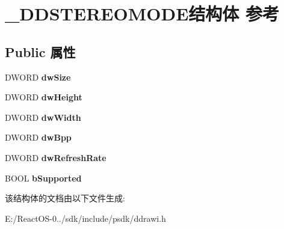 \hypertarget{struct___d_d_s_t_e_r_e_o_m_o_d_e}{}\section{\+\_\+\+D\+D\+S\+T\+E\+R\+E\+O\+M\+O\+D\+E结构体 参考}
\label{struct___d_d_s_t_e_r_e_o_m_o_d_e}
\subsection*{Public 属性}
\begin{DoxyCompactItemize}
\item 
\mbox{\label{struct___d_d_s_t_e_r_e_o_m_o_d_e_a9ff3888524b7dccf7f8a01f7ea3d453a}} 
D\+W\+O\+RD {\bfseries dw\+Size}
\item 
\mbox{\label{struct___d_d_s_t_e_r_e_o_m_o_d_e_a4dc19ec0fc458dbc72e7c79afea9fb75}} 
D\+W\+O\+RD {\bfseries dw\+Height}
\item 
\mbox{\label{struct___d_d_s_t_e_r_e_o_m_o_d_e_a5484e8bfe0187768401aba802f1dcd6e}} 
D\+W\+O\+RD {\bfseries dw\+Width}
\item 
\mbox{\label{struct___d_d_s_t_e_r_e_o_m_o_d_e_a000f61c9351d41a2a56aeb2908aded0e}} 
D\+W\+O\+RD {\bfseries dw\+Bpp}
\item 
\mbox{\label{struct___d_d_s_t_e_r_e_o_m_o_d_e_a786c2b7f7c5397c35035e49139575684}} 
D\+W\+O\+RD {\bfseries dw\+Refresh\+Rate}
\item 
\mbox{\label{struct___d_d_s_t_e_r_e_o_m_o_d_e_a964571ce7af51eec48fbd7d00c5e1c5d}} 
B\+O\+OL {\bfseries b\+Supported}
\end{DoxyCompactItemize}


该结构体的文档由以下文件生成\+:\begin{DoxyCompactItemize}
\item 
E\+:/\+React\+O\+S-\/0../sdk/include/psdk/ddrawi.\+h\end{DoxyCompactItemize}
